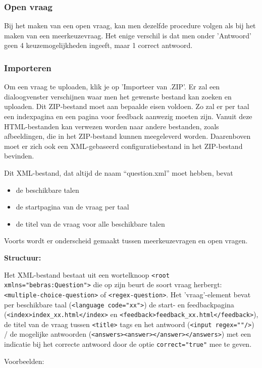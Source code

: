 \documentclass[]{article}
\begin{document}
\subsubsection{Open vraag}

Bij het maken van een open vraag, kan men dezelfde procedure volgen als bij het maken van een meerkeuzevraag. Het enige verschil is dat men onder 'Antwoord' geen 4 keuzemogelijkheden ingeeft, maar 1 correct antwoord.

\subsubsection{Importeren}
Om een vraag te uploaden, klik je op 'Importeer van .ZIP'. Er zal een dialoogvenster verschijnen waar men het gewenste bestand kan zoeken en uploaden. Dit ZIP-bestand moet aan bepaalde eisen voldoen. Zo zal er per taal een indexpagina en een pagina voor feedback aanwezig moeten zijn. Vanuit deze HTML-bestanden kan verwezen worden naar andere bestanden, zoals afbeeldingen, die in het ZIP-bestand kunnen meegeleverd worden. Daarenboven moet er zich ook een XML-gebaseerd configuratiebestand in het ZIP-bestand bevinden. 

Dit XML-bestand, dat altijd de naam "`question.xml"' moet hebben, bevat
\begin{itemize}
\item de beschikbare talen
\item de startpagina van de vraag per taal
\item de titel van de vraag voor alle beschikbare talen
\end{itemize}

Voorts wordt er onderscheid gemaakt tussen meerkeuzevragen en open vragen.

\textbf{Structuur:}

Het XML-bestand bestaat uit een wortelknoop \verb+<root xmlns="bebras:Question">+ 
die op zijn beurt de soort vraag herbergt: \verb+<multiple-choice-question>+ of \verb+<regex-question>+.
Het 'vraag'-element bevat per beschikbare taal (\verb+<language code="xx">+) 
de start- en feedbackpagina (\verb+<index>index_xx.html</index>+ en \verb+<feedback>feedback_xx.html</feedback>+), 
de titel van de vraag tussen \verb+<title>+ tags 
en het antwoord (\verb+<input regex=""/>+) / de mogelijke antwoorden (\verb+<answers><answer></answer></answers>+)
met een indicatie bij het correcte antwoord door de optie \verb+correct="true"+ mee te geven.

Voorbeelden:

 
\end{document}
